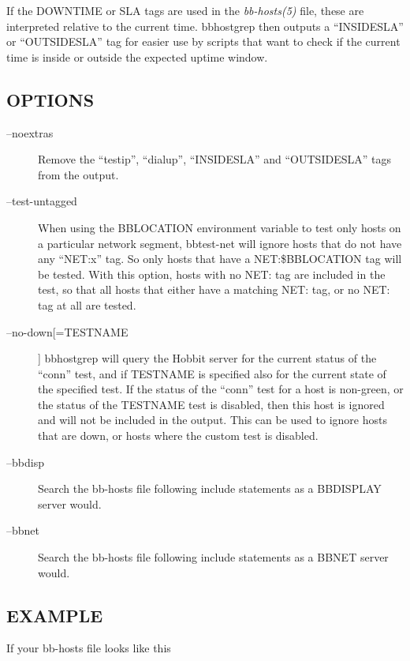   If the DOWNTIME or SLA tags are used in the \emph{bb-hosts(5)} file,
  these are interpreted relative to the current time. bbhostgrep then
  outputs a ``INSIDESLA'' or ``OUTSIDESLA'' tag for easier use by
  scripts that want to check if the current time is inside or outside
  the expected uptime window. 



 
\subsection{OPTIONS}
\begin{description}
\item[--noextras] Remove the ``testip'', ``dialup'', ``INSIDESLA'' and ``OUTSIDESLA'' tags from the output. 

 

\item[--test-untagged] When using the BBLOCATION environment variable
  to test only hosts on a particular network segment, bbtest-net will
  ignore hosts that do not have any ``NET:x'' tag. So only hosts that
  have a NET:\$BBLOCATION tag will be tested.   With this option,
  hosts with no NET: tag are included in the test, so that all hosts
  that either have a matching NET: tag, or no NET: tag at all are
  tested. 


 

\item[--no-down[=TESTNAME]] bbhostgrep will query the Hobbit server
  for the current status of the ``conn'' test, and if TESTNAME is
  specified also for the current state of the specified test. If the
  status of the ``conn'' test for a host is non-green, or the status
  of the TESTNAME test is disabled, then this host is ignored and will
  not be included in the output. This can be used to ignore hosts that
  are down, or hosts where the custom test is disabled. 


 

\item[--bbdisp] Search the bb-hosts file following include statements
  as a BBDISPLAY server would. 


 

\item[--bbnet] Search the bb-hosts file following include statements
  as a BBNET server would. 


 


\end{description}
\subsection{EXAMPLE}
 If your bb-hosts file looks like this 

